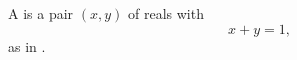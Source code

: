 
\begin{definition}\label{def:object}
A  is a pair $(x, y)$ of reals with
\begin{equation}\label{eq:object}
  x + y = 1 ,
\end{equation}
as in \cite[Def. 1]{alpha2020work}.
\end{definition}
